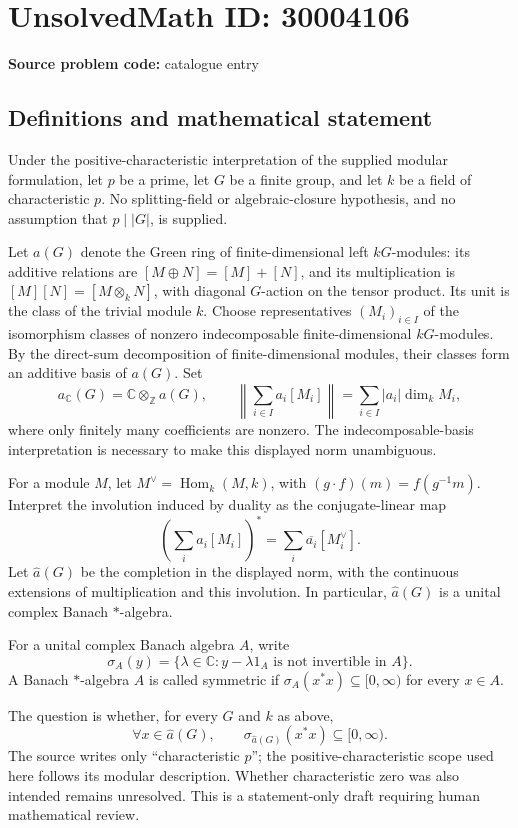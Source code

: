 \documentclass[11pt]{article}
\begin{document}
\section*{UnsolvedMath ID: 30004106}
\textbf{Source problem code:} catalogue entry
\subsection{Definitions and mathematical statement}
Under the positive-characteristic interpretation of the supplied modular formulation, let \(p\) be a prime, let \(G\) be a finite group, and let \(k\) be a field of characteristic \(p\). No splitting-field or algebraic-closure hypothesis, and no assumption that \(p\mid |G|\), is supplied.

Let \(a(G)\) denote the Green ring of finite-dimensional left \(kG\)-modules: its additive relations are \([M\oplus N]=[M]+[N]\), and its multiplication is \([M][N]=[M\otimes_k N]\), with diagonal \(G\)-action on the tensor product. Its unit is the class of the trivial module \(k\). Choose representatives \((M_i)_{i\in I}\) of the isomorphism classes of nonzero indecomposable finite-dimensional \(kG\)-modules. By the direct-sum decomposition of finite-dimensional modules, their classes form an additive basis of \(a(G)\). Set
\[
 a_{\mathbb C}(G)=\mathbb C\otimes_{\mathbb Z}a(G),\qquad
 \left\|\sum_{i\in I}a_i[M_i]\right\|=\sum_{i\in I}|a_i|\dim_k M_i,
\]
where only finitely many coefficients are nonzero. The indecomposable-basis interpretation is necessary to make this displayed norm unambiguous.

For a module \(M\), let \(M^\vee=\operatorname{Hom}_k(M,k)\), with \((g\cdot f)(m)=f(g^{-1}m)\). Interpret the involution induced by duality as the conjugate-linear map
\[
 \left(\sum_i a_i[M_i]\right)^*=\sum_i\overline{a_i}[M_i^\vee].
\]
Let \(\widehat a(G)\) be the completion in the displayed norm, with the continuous extensions of multiplication and this involution. In particular, \(\widehat a(G)\) is a unital complex Banach \(*\)-algebra.

For a unital complex Banach algebra \(A\), write
\[
 \sigma_A(y)=\{\lambda\in\mathbb C:y-\lambda 1_A\text{ is not invertible in }A\}.
\]
A Banach \(*\)-algebra \(A\) is called symmetric if \(\sigma_A(x^*x)\subseteq[0,\infty)\) for every \(x\in A\).

The question is whether, for every \(G\) and \(k\) as above,
\[
 \forall x\in\widehat a(G),\qquad
 \sigma_{\widehat a(G)}(x^*x)\subseteq[0,\infty).
\]
The source writes only ``characteristic \(p\)''; the positive-characteristic scope used here follows its modular description. Whether characteristic zero was also intended remains unresolved. This is a statement-only draft requiring human mathematical review.
\end{document}
